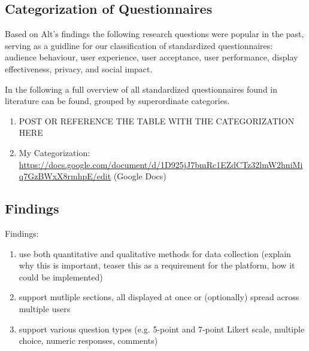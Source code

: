 \subsection{Categorization of Questionnaires}



	Based on Alt's \cite{alt2013thesis} findings the following research questions were popular in the past, serving as a guidline for our classification of standardized questionnaires: audience behaviour, user experience, user acceptance, user performance, display effectiveness, privacy, and social impact. 

	In the following a full overview of all standardized questionnaires found in literature can be found, grouped by superordinate categories.






		\label{table:standardized-questionnaires}


		\begin{enumerate}
			\item POST OR REFERENCE THE TABLE WITH THE CATEGORIZATION HERE
			\item My Categorization: \url{https://docs.google.com/document/d/1D925jJ7bmRc1EZdCTz32lmW2hniMiq7GzBWxX8rmhpE/edit} (Google Docs)
		\end{enumerate}






\subsection{Findings}

	Findings: 
	\begin{enumerate}
	\item use both quantitative and qualitative methods for data collection (explain why this is important, teaser this as a requirement for the platform, how it could be implemented)
	\item support mutliple sections, all displayed at once or (optionally) spread across multiple users
	\item support various question types (e.g. 5-point and 7-point Likert scale, multiple choice, numeric responses, comments)
	\end{enumerate}




